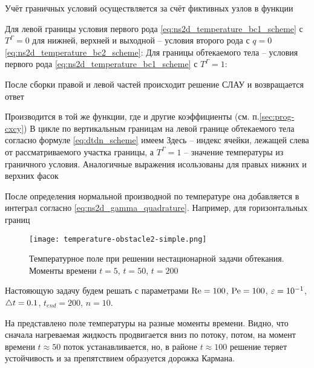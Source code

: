 Учёт граничных условий осуществляется за счёт фиктивных узлов
в функции 

Для левой границы условия первого рода
\cref{eq:ns2d_temperature_bc1_scheme} с $T^\Gamma = 0$
для нижней, верхней и выходной -- 
условия второго рода с $q=0$ \cref{eq:ns2d_temperature_bc2_scheme}:
Для границы обтекаемого тела -- условия первого рода
\cref{eq:ns2d_temperature_bc1_scheme} с $T^\Gamma = 1$:

После сборки правой и левой частей происходит
решение СЛАУ и возвращается ответ

Производится в той же функции, где и другие коэффициенты (см. п.\ref{sec:prog-cxcy})
В цикле по вертикальным границам
на левой границе обтекаемого тела согласно формуле
\cref{eq:dtdn_scheme} имеем
Здесь  -- индекс ячейки, лежащей слева от рассматриваемого участка границы,
а $T^\Gamma = 1$ -- значение температуры из граничного условия.
Аналогичные выражения исользованы для правых
нижних
и верхних фасок

После определения нормальной производной по температуре
она добавляется в интеграл согласно \cref{eq:ns2d_gamma_quadrature}.
Например, для горизонтальных границ


\begin{figure}[h!]
\centering
\texttt{[image: temperature-obstacle2-simple.png]}
\caption{Температурное поле при решении нестационарной задачи обтекания. Моменты времени $t=5$, $t=50$, $t=200$}
\label{fig:temperature-obstacle2-simple}
\end{figure}

Настояющую задачу будем решать с параметрами
$\mathrm{Re} = 100$, $\mathrm{Pe} = 100$, $\varepsilon=10^{-1}$, $\triangle t = 0.1$, $t_{end} = 200$, $n=10$.

На 
представлено поле температуры на разные моменты времени.
Видно, что сначала нагреваемая жидкость продвигается вниз по потоку,
потом, на момент времени $t\approx50$ поток устанавливается,
но, в районе $t\approx100$ решение теряет устойчивость
и за препятствием образуется дорожка Кармана.

